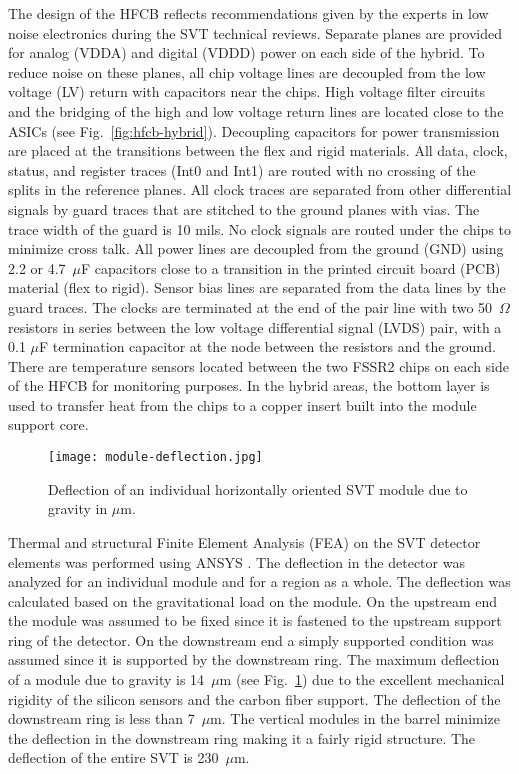 The design of the HFCB reflects recommendations given by the experts in low noise  electronics during the SVT technical reviews. Separate planes are provided for analog (VDDA) and digital (VDDD) power on each side of the hybrid. To reduce noise on these planes, all chip voltage lines are decoupled from the low voltage (LV) return with capacitors near the chips. High voltage filter circuits and the bridging of the high and low voltage return lines are located close to the ASICs (see Fig.~\ref{fig:hfcb-hybrid}). Decoupling capacitors for power transmission are placed at the transitions between the flex and rigid materials. All data, clock, status, and register traces (Int0 and Int1) are routed with no crossing of the splits in the reference planes. All clock traces are separated from other differential signals by guard traces that are stitched to the ground planes with vias. The trace width of the guard is 10 mils. No clock signals are routed under the chips to minimize cross talk. All power lines are  decoupled from the ground (GND) using 2.2 or 4.7~$\mu$F capacitors close to a transition in the printed circuit board (PCB) material (flex to rigid). Sensor bias lines are separated from the data lines by the guard traces. The clocks are terminated at the end of the pair line with two 50~$\Omega$ resistors in series between the low voltage differential signal (LVDS) pair, with a 0.1 $\mu$F termination capacitor at the node between the resistors and the ground. There are temperature sensors located between the two FSSR2 chips on each side of the HFCB for monitoring purposes. In the hybrid areas, the bottom layer is used to transfer heat from the chips to a copper insert built into the module support core. 

\begin{figure}[h] 
\centering 
\texttt{[image: module-deflection.jpg]}
\caption{Deflection of an individual horizontally oriented SVT module due to gravity in $\mu$m.}
\label{fig:module-deflection}
\end{figure}

Thermal and structural Finite Element Analysis (FEA) on the SVT detector elements was performed using ANSYS \cite{ANSYS}. The deflection in the detector was analyzed for an individual module and for a region as a whole. The deflection was calculated based on the gravitational load on the module. On the upstream end the module was assumed to be fixed since it is fastened to the upstream support ring of the detector. On the downstream end a simply supported condition was assumed since it is supported by the downstream ring. The maximum deflection of a module due to gravity is 14~$\mu$m (see Fig.~\ref{fig:module-deflection}) due to the excellent mechanical rigidity of the silicon sensors and the carbon fiber support. The deflection of the downstream ring is less than 7~$\mu$m. The vertical modules in the barrel minimize the deflection in the downstream ring making it a fairly rigid structure. The deflection of the entire SVT is 230~$\mu$m. 


